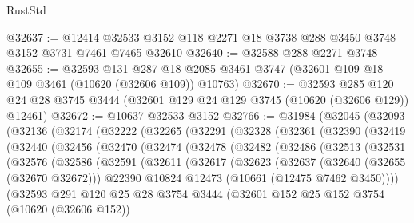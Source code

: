 \begin{lexlean}{RustStd}
\begin{coremodule}
@32637 := @12414 @32533 @3152 @118 @2271 @18 @3738 @288 @3450 @3748 @3152 @3731 @7461 @7465 @32610
@32640 := @32588 @288 @2271 @3748
@32655 := @32593
    @131
    @287
    @18
    @2085
    @3461
    @3747
    (@32601 @109 @18 @109 @3461 (@10620 (@32606 @109)) @10763)
@32670 := @32593
    @285
    @120
    @24
    @28
    @3745
    @3444
    (@32601 @129 @24 @129 @3745 (@10620 (@32606 @129)) @12461)
@32672 := @10637 @32533 @3152
@32766 := @31984
    (@32045
      (@32093
        (@32136
          (@32174
            (@32222
              (@32265
                (@32291
                  (@32328
                    (@32361
                      (@32390
                        (@32419
                          (@32440
                            (@32456
                              (@32470
                                (@32474
                                  (@32478
                                    (@32482
                                      (@32486
                                        (@32513
                                          (@32531
                                            (@32576
                                              (@32586
                                                (@32591
                                                  (@32611
                                                    (@32617
                                                      (@32623
                                                        (@32637
                                                          (@32640 (@32655 (@32670 @32672)))
                                                          @22390
                                                          @10824
                                                          @12473
                                                          (@10661 (@12475 @7462 @3450))))
                                                      (@32593
                                                        @291
                                                        @120
                                                        @25
                                                        @28
                                                        @3754
                                                        @3444
                                                        (@32601
                                                          @152
                                                          @25
                                                          @152
                                                          @3754
                                                          (@10620 (@32606 @152))

\end{coremodule}
\end{lexlean}
